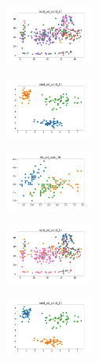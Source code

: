 \begin{figure}[H]
\begin{subfigure}
    \end{subfigure}
    \hfill
    \begin{subfigure}
        \centering
        \includegraphics[width=0.32\textwidth]{img/copkm/ecoli_set_const_10_589741062_clust.png}
    \end{subfigure}
    \hfill
    \begin{subfigure}
        \centering
        \includegraphics[width=0.32\textwidth]{img/copkm/rand_set_const_10_589741062_clust.png}
    \end{subfigure}
    \hfill
    \begin{subfigure}
        \centering
        \includegraphics[width=0.32\textwidth]{img/copkm/iris_set_const_10_277451237_clust.png}
    \end{subfigure}
    \hfill
    \begin{subfigure}
        \centering
        \includegraphics[width=0.32\textwidth]{img/copkm/ecoli_set_const_10_277451237_clust.png}
    \end{subfigure}
    \hfill
    \begin{subfigure}
        \centering
        \includegraphics[width=0.32\textwidth]{img/copkm/rand_set_const_10_277451237_clust.png}

\end{subfigure}
\end{figure}
